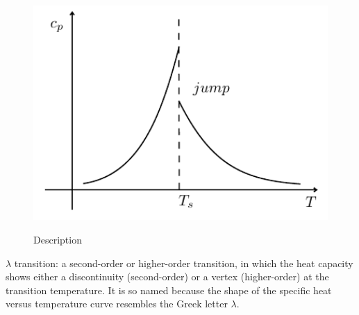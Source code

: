 \documentclass[../main/main.tex]{subfiles}
\begin{document}
\begin{figure}[h!]
\begin{minipage}[c]{0.5\linewidth}
{\includegraphics[width=1\textwidth]{../lessons/3_image/8.pdf}

    \label{fig:3_04_3} }
\end{minipage}
\begin{minipage}[]{0.5\linewidth}
\centering
{}
\end{minipage}
\caption{\label{fig:} Description}
\end{figure}

\begin{remark}
\( \lambda  \) transition: a second-order or higher-order transition, in which the heat capacity shows either a discontinuity (second-order) or a vertex (higher-order) at the transition temperature.  It is so named because the shape of the specific heat versus temperature curve resembles the Greek letter \( \lambda  \).
\end{remark}
\end{document}
